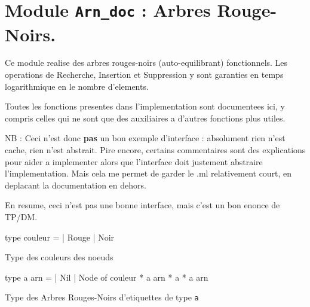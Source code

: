 \documentclass[11pt]{article}
\begin{document}
\tableofcontents
\section{Module {\tt{Arn\_doc}} : Arbres Rouge-Noirs.}
\label{module:Arn-underscoredoc}



    Ce module realise des arbres rouges-noirs (auto-equilibrant)
    fonctionnels. Les operations de Recherche, Insertion et 
    Suppression y sont garanties en temps logarithmique en 
    le nombre d'elements. 


    Toutes les fonctions presentes dans l'implementation sont
    documentees ici, y compris celles qui ne sont que des 
    auxiliaires a d'autres fonctions plus utiles.


    NB : Ceci n'est donc {\bf pas} un bon exemple d'interface : 
    absolument rien n'est cache, rien n'est abstrait. Pire encore,
    certains commentaires sont des explications pour aider a
    implementer alors que l'interface doit justement abstraire
    l'implementation. Mais cela me permet de garder le .ml
    relativement court, en deplacant la documentation en dehors.


    En resume, ceci n'est pas une bonne interface, mais c'est un bon enonce de TP/DM.



\ocamldocvspace{0.5cm}



\label{type:Arn-underscoredoc.couleur}\begin{ocamldoccode}
type couleur =
  | Rouge
  | Noir
\end{ocamldoccode}
\begin{ocamldocdescription}
Type des couleurs des noeuds


\end{ocamldocdescription}




\label{type:Arn-underscoredoc.arn}\begin{ocamldoccode}
type {\textquotesingle}a arn =
  | Nil
  | Node of couleur * {\textquotesingle}a arn * {\textquotesingle}a * {\textquotesingle}a arn
\end{ocamldoccode}
\begin{ocamldocdescription}
Type des Arbres Rouges-Noirs d'etiquettes de type {\tt{{\textquotesingle}a}}


\end{ocamldocdescription}
\end{document}
